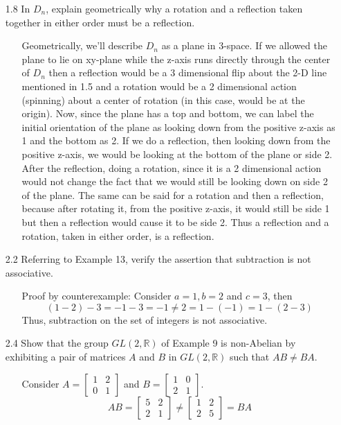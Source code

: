 \documentclass[12pt]{article}
\begin{document}
\begin{enumerate}
\item[1.8] In $D_n$, explain geometrically why a rotation and a reflection taken together in either order
must be a reflection.
\begin{enumerate}
\item[] Geometrically, we'll describe $D_n$ as a plane in 3-space. 
If we allowed the plane to lie on xy-plane while the z-axis runs directly through the center 
of $D_n$ then a reflection would be a 3 dimensional flip about the 2-D line mentioned in 1.5 and 
a rotation would be a 2 dimensional action (spinning) about a center of rotation (in this case,
would be at the origin). Now, since the plane has a top and bottom, we can label the initial
orientation of the plane as looking down from the positive z-axis as 1 and the bottom as 2.
If we do a reflection, then looking down from the positive z-axis, we would be looking at
the bottom of the plane or side 2. After the reflection, doing a rotation, since it is a
2 dimensional action would not change the fact that we would still be looking down on 
side 2 of the plane. The same can be said for a rotation and then a reflection, because
after rotating it, from the positive z-axis, it would still be side 1 but then a reflection
would cause it to be side 2. Thus a reflection and a rotation, taken in either order, 
is a reflection.
\end{enumerate}


\item[2.2] Referring to Example 13, verify the assertion that subtraction is not associative.
\begin{enumerate}
\item[] Proof by counterexample: Consider $a = 1, b = 2$ and $c = 3$, then
\[ (1 - 2) - 3 = -1 - 3 = -1 \neq 2 = 1 - (-1) = 1 - (2 - 3) \]
Thus, subtraction on the set of integers is not associative.
\end{enumerate}


\item[2.4] Show that the group $GL(2, \mathbb{R})$ of Example 9 is non-Abelian by exhibiting
a pair of matrices $A$ and $B$ in $GL(2, \mathbb{R})$ such that $AB \neq BA$.
\begin{enumerate}
\item[] Consider $A = \left[ \begin{array}{cc} 1 & 2 \\ 0 & 1 \end{array} \right]$ and 
$B = \left[ \begin{array}{cc} 1 & 0 \\ 2 & 1 \end{array} \right]$. 
\[ 
AB = \left[ \begin{array}{cc} 5 & 2 \\ 2 & 1 \end{array} \right] \neq 
\left[ \begin{array}{cc} 1 & 2 \\ 2 & 5 \end{array} \right] = BA 
\]
\end{enumerate}


\end{enumerate}
\end{document}
